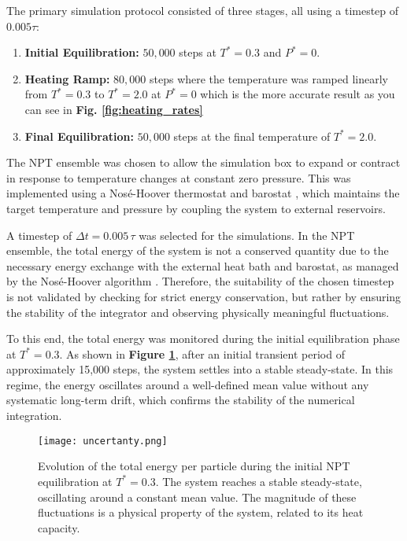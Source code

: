 \documentclass{article}
\begin{document}
The primary simulation protocol consisted of three stages, all using a timestep of $0.005\tau$:
\begin{enumerate}
    \item \textbf{Initial Equilibration:} $50,000$ steps at $T^*=0.3$ and $P^*=0$.
    \item \textbf{Heating Ramp:} $80,000$ steps where the temperature was ramped linearly from $T^*=0.3$ to $T^*=2.0$ at $P^*=0$ which is the more accurate result as you can see in \textbf{Fig. \ref{fig:heating_rates}}
    \item \textbf{Final Equilibration:} $50,000$ steps at the final temperature of $T^*=2.0$.
\end{enumerate}
The NPT ensemble was chosen to allow the simulation box to expand or contract in response to temperature changes at constant zero pressure. This was implemented using a Nosé-Hoover thermostat and barostat \cite{Nose, Hoover}, which maintains the target temperature and pressure by coupling the system to external reservoirs.


A timestep of $\Delta t = 0.005\,\tau$ was selected for the simulations. In the NPT ensemble, the total energy of the system is not a conserved quantity due to the necessary energy exchange with the external heat bath and barostat, as managed by the Nosé-Hoover algorithm \cite{Nose, Hoover}. Therefore, the suitability of the chosen timestep is not validated by checking for strict energy conservation, but rather by ensuring the stability of the integrator and observing physically meaningful fluctuations.

To this end, the total energy was monitored during the initial equilibration phase at $T^*=0.3$. As shown in \textbf{Figure \ref{fig:npt_energy_equilibration}}, after an initial transient period of approximately 15,000 steps, the system settles into a stable steady-state. In this regime, the energy oscillates around a well-defined mean value without any systematic long-term drift, which confirms the stability of the numerical integration.

\begin{figure}[htbp]
    \centering
    \texttt{[image: uncertanty.png]}
    \caption{Evolution of the total energy per particle during the initial NPT equilibration at $T^*=0.3$. The system reaches a stable steady-state, oscillating around a constant mean value. The magnitude of these fluctuations is a physical property of the system, related to its heat capacity.}
    \label{fig:npt_energy_equilibration}
\end{figure}
\end{document}
